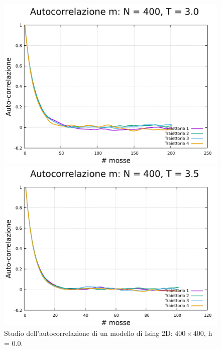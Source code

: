 \begin{figure}[H]
    \begin{minipage}{0.45\textwidth}  
      \centering
      \includegraphics[page=1, width=\textwidth]{Immagini/simIsing2D/metro/tcorr/auto_400_3.0.pdf}
      \caption{$T\,=\,3.0$}
    \end{minipage}\hfill
    \begin{minipage}{0.45\textwidth}  
      \centering
      \includegraphics[page=1, width=\textwidth]{Immagini/simIsing2D/metro/tcorr/auto_400_3.5.pdf}
      \caption{$T\,=\,3.5$}
    \end{minipage}
    \caption{Studio dell'autocorrelazione di un modello di Ising 2D: $400 \times 400$, h = 0.0.}
\end{figure}

